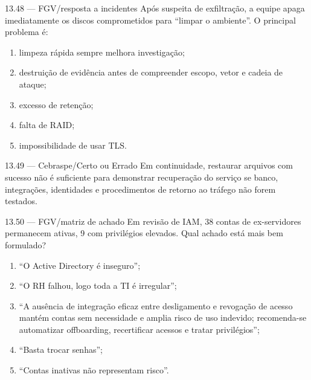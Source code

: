 \begin{questao}{ 13.48 — FGV/resposta a incidentes}
Após suspeita de exfiltração, a equipe apaga imediatamente os discos comprometidos para ``limpar o ambiente''. O principal problema é:
\begin{enumerate}[label=\Alph*)]
\item limpeza rápida sempre melhora investigação;
\item destruição de evidência antes de compreender escopo, vetor e cadeia de ataque;
\item excesso de retenção;
\item falta de RAID;
\item impossibilidade de usar TLS.
\end{enumerate}
\end{questao}

\begin{questao}{ 13.49 — Cebraspe/Certo ou Errado}
Em continuidade, restaurar arquivos com sucesso não é suficiente para demonstrar recuperação do serviço se banco, integrações, identidades e procedimentos de retorno ao tráfego não forem testados.
\end{questao}

\begin{questao}{ 13.50 — FGV/matriz de achado}
Em revisão de IAM, 38 contas de ex-servidores permanecem ativas, 9 com privilégios elevados. Qual achado está mais bem formulado?
\begin{enumerate}[label=\Alph*)]
\item ``O Active Directory é inseguro'';
\item ``O RH falhou, logo toda a TI é irregular'';
\item ``A ausência de integração eficaz entre desligamento e revogação de acesso mantém contas sem necessidade e amplia risco de uso indevido; recomenda-se automatizar offboarding, recertificar acessos e tratar privilégios'';
\item ``Basta trocar senhas'';
\item ``Contas inativas não representam risco''.
\end{enumerate}
\end{questao}
